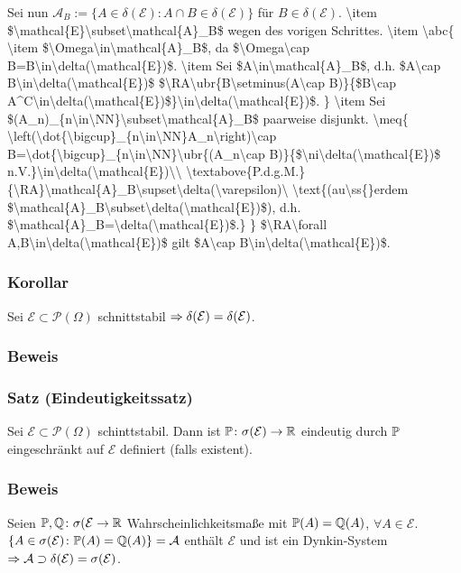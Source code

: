 Sei nun $\mathcal{A}_B:=\{A\in\delta(\mathcal{E})\colon A\cap B\in\delta(\mathcal{E})\}$ f\"ur $B\in\delta(\mathcal{E})$.
\num{
\item $\mathcal{E}\subset\mathcal{A}_B$ wegen des vorigen Schrittes.
\item
\abc{
\item $\Omega\in\mathcal{A}_B$, da $\Omega\cap B=B\in\delta(\mathcal{E})$.
\item Sei $A\in\mathcal{A}_B$, d.h. $A\cap B\in\delta(\mathcal{E})$ $\RA\ubr{B\setminus(A\cap B)}{$B\cap A^C\in\delta(\mathcal{E})$}\in\delta(\mathcal{E})$.
}
\item Sei $(A_n)_{n\in\NN}\subset\mathcal{A}_B$ paarweise disjunkt.
\meq{
\left(\dot{\bigcup}_{n\in\NN}A_n\right)\cap B=\dot{\bigcup}_{n\in\NN}\ubr{(A_n\cap B)}{$\ni\delta(\mathcal{E})$ n.V.}\in\delta(\mathcal{E})\\
\textabove{P.d.g.M.}{\RA}\mathcal{A}_B\supset\delta(\varepsilon)\ \text{(au\ss{}erdem $\mathcal{A}_B\subset\delta(\mathcal{E})$), d.h. $\mathcal{A}_B=\delta(\mathcal{E})$.}
}
$\RA\forall A,B\in\delta(\mathcal{E})$ gilt $A\cap B\in\delta(\mathcal{E})$.
}
\subsubsection{Korollar}
Sei $\mathcal{E}\subset\mathcal{P}(\Omega)$ schnittstabil $\Rightarrow\delta(\mathcal{E})=\delta(\mathcal{E})$.
\subsubsection{Beweis}
\subsubsection{Satz (Eindeutigkeitssatz)}
Sei $\mathcal{E}\subset\mathcal{P}(\Omega)$ schinttstabil. Dann ist $\mathbb{P}\colon\sigma(\mathcal{E})\to\mathbb{R}$ eindeutig durch $\mathbb{P}$ eingeschr\"ankt auf $\mathcal{E}$ definiert (falls existent).
\subsubsection{Beweis}
Seien $\mathbb{P},\mathbb{Q}\colon\sigma(\mathcal{E}\to\mathbb{R}$ Wahrscheinlichkeitsma\ss{}e mit $\mathbb{P}(A)=\mathbb{Q}(A)$, $\forall A\in\mathcal{E}$. $\{A\in\sigma(\mathcal{E})\colon\mathbb{P}(A)=\mathbb{Q}(A)\}=\mathcal{A}$ enth\"alt $\mathcal{E}$ und ist ein Dynkin-System $\Rightarrow\mathcal{A}\supset\delta(\mathcal{E})=\sigma(\mathcal{E})$.
